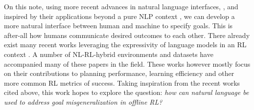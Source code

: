\documentclass[../thesis-proposal/main.tex]{subfiles}
\begin{document}
On this note, using more recent advances in natural language interfaces, \citep{gal_image_2022,
reynolds_prompt_2021, wu_ai_2022}, and inspired by their applications beyond a pure NLP context
\citep{dosovitskiy_image_2022, ramesh_hierarchical_2022, rombach_high-resolution_2022}, we can
develop a more natural interface between human and machine to specify goals. This is after-all how
humans communicate desired outcomes to each other. There already exist many recent works leveraging
the expressivity of language models in an RL context \citep{reed_generalist_2022,
  watkins_teachable_2021, sumers_learning_2021, zhou_inverse_2021,
sumers_how_2022,zhang_lad_2022,deepmind_interactive_agents_team_creating_2022,kumar_using_2022,lampinen_tell_2022,lin_inferring_2022,tomlin_understanding_2022,jiang_vima_2022,sumers_distilling_2023,choi_lmpriors_2022}.
A number of NL-RL-hybrid environments and datasets \citep{anderson_vision-and-language_2018,
fan_minedojo_2022} have accompanied many of these papers in the field. These works however mostly
focus on their contributions to planning performance, learning efficiency and other more common RL
metrics of success. Taking inspiration from the recent works cited above, this work hopes to explore
the question: \textit{how can natural language be used to address goal misgeneralization in offline
RL?}

\ifSubfilesClassLoaded{%
  
}{}
\end{document}
